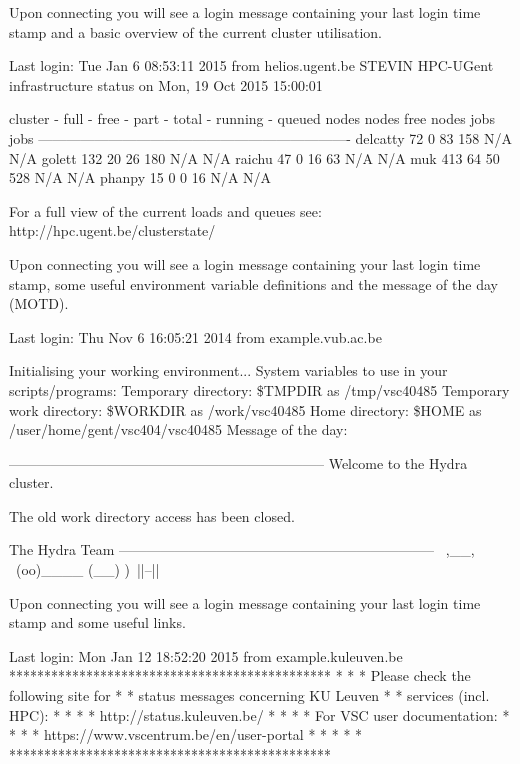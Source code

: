 \ifgent
Upon connecting you will see a login message containing your last login
time stamp and a basic overview of the current cluster utilisation.
\begin{prompt}
Last login: Tue Jan  6 08:53:11 2015 from helios.ugent.be
STEVIN HPC-UGent infrastructure status on Mon, 19 Oct 2015 15:00:01

   cluster - full - free -  part - total - running - queued
             nodes  nodes   free   nodes    jobs      jobs
-------------------------------------------------------------------
  delcatty     72      0     83     158      N/A       N/A
    golett    132     20     26     180      N/A       N/A
    raichu     47      0     16      63      N/A       N/A
       muk    413     64     50     528      N/A       N/A
    phanpy     15      0      0      16      N/A       N/A

For a full view of the current loads and queues see:
 http://hpc.ugent.be/clusterstate/

\end{prompt}
\fi
\ifbrussel
Upon connecting you will see a login message containing your last login
time stamp, some useful environment variable definitions and the message of the
day (MOTD).
\begin{prompt}
Last login: Thu Nov  6 16:05:21 2014 from example.vub.ac.be

Initialising your working environment...
System variables to use in your scripts/programs:
  Temporary directory:   \$TMPDIR as /tmp/vsc40485
  Temporary work directory:    \$WORKDIR as /work/vsc40485
  Home directory:              \$HOME as /user/home/gent/vsc404/vsc40485
Message of the day:

  --------------------------------------------------------------------
  Welcome to the Hydra cluster.

  The old work directory access has been closed.


  The Hydra Team
  --------------------------------------------------------------------
       \   ,__,
        \  (oo)____
           (__)    )\
              ||--||

\end{prompt}
\fi

\ifleuven
Upon connecting you will see a login message containing your last login
time stamp and some useful links.
\begin{prompt}
Last login: Mon Jan 12 18:52:20 2015 from example.kuleuven.be
**********************************************
*                                            *
* Please check the following site for        *
* status messages concerning KU Leuven       *
* services (incl. HPC):                      *
*                                            *
*   http://status.kuleuven.be/               *
*                                            *
* For VSC user documentation:                *
*                                            *
*  https://www.vscentrum.be/en/user-portal   *
*                                            *
*                                            *
**********************************************
\end{prompt}
\fi

